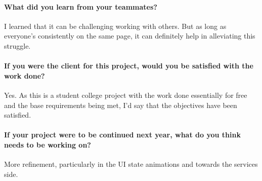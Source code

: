 \paragraph{What did you learn from your
teammates?}\label{what-did-you-learn-from-your-teammates}
I learned that it can be challenging working with others. But as long as
everyone's consistently on the same page, it can definitely help in
alleviating this struggle.
\paragraph{If you were the client for this project, would you be
satisfied with the work
done?}\label{if-you-were-the-client-for-this-project-would-you-be-satisfied-with-the-work-done}
Yes. As this is a student college project with the work done essentially
for free and the base requirements being met, I'd say that the
objectives have been satisfied.
\paragraph{If your project were to be continued next year, what do you
think needs to be working
on?}\label{if-your-project-were-to-be-continued-next-year-what-do-you-think-needs-to-be-working-on}
More refinement, particularly in the UI state animations and towards the
services side.

